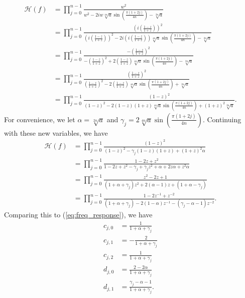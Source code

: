 \documentclass[a4paper]{article}
\begin{document}
\begin{align}
    \mathcal{H}(f) &= \prod_{j=0}^{n - 1}\frac{w^2}
        {w^2 - 2 i w \sqrt[4n]{a} \sin\left(\frac{\pi (1 + 2 j)}{4 n}\right) - \sqrt[2n]{a}} \\
    &= \prod_{j=0}^{n - 1}\frac{\left(i\left(\frac{1 - z}{1 + z}\right)\right)^2}
        {\left(i\left(\frac{1 - z}{1 + z}\right)\right)^2 - 2 i \left(i\left(\frac{1 - z}{1 + z}\right)\right) \sqrt[4n]{a} \sin\left(\frac{\pi (1 + 2 j)}{4 n}\right) - \sqrt[2n]{a}} \\
    &= \prod_{j=0}^{n - 1}\frac{-\left(\frac{1 - z}{1 + z}\right)^2}
        {-\left(\frac{1 - z}{1 + z}\right)^2 + 2 \left(\frac{1 - z}{1 + z}\right) \sqrt[4n]{a} \sin\left(\frac{\pi (1 + 2 j)}{4 n}\right) - \sqrt[2n]{a}} \\
    &= \prod_{j=0}^{n - 1}\frac{\left(\frac{1 - z}{1 + z}\right)^2}
        {\left(\frac{1 - z}{1 + z}\right)^2 - 2 \left(\frac{1 - z}{1 + z}\right) \sqrt[4n]{a} \sin\left(\frac{\pi (1 + 2 j)}{4 n}\right) + \sqrt[2n]{a}} \\
    &= \prod_{j=0}^{n - 1}\frac{(1 - z)^2}
        {(1 - z)^2 - 2 (1 - z)(1 + z) \sqrt[4n]{a} \sin\left(\frac{\pi (1 + 2 j)}{4 n}\right) + (1 + z)^2 \sqrt[2n]{a}}.
\end{align}
For convenience, we let $\alpha = \sqrt[2n]{a}$ and $\gamma_j = 2 \sqrt[4n]{a} \sin\left(\frac{\pi (1 + 2 j)}{4 n}\right)$.
Continuing with these new variables, we have
\begin{align}
    \mathcal{H}(f) &= \prod_{j=0}^{n - 1}\frac{(1 - z)^2}
        {(1 - z)^2 - \gamma_j (1 - z)(1 + z) + (1 + z)^2 \alpha} \\
    &= \prod_{j=0}^{n - 1}\frac{1 - 2z + z^2}
        {1 - 2z + z^2 - \gamma_j + \gamma_j z^2 + \alpha + 2z \alpha + z^2 \alpha} \\
    &= \prod_{j=0}^{n - 1}\frac{z^2 - 2z + 1}
        {(1 + \alpha + \gamma_j)z^2 + 2(\alpha - 1) z + (1 + \alpha - \gamma_j)} \\
        &= \prod_{j=0}^{n - 1}\frac{1 - 2z^{-1} + z^{-2}}
        {(1 + \alpha + \gamma_j) - 2(1 - \alpha) z^{-1} - (\gamma_j - \alpha - 1)z^{-2}}.
\end{align}
Comparing this to (\ref{eq:freq_response}), we have
\begin{align}
    c_{j,0} &= \frac{1}{1 + \alpha + \gamma_j} \\
    c_{j,1} &= -\frac{2}{1 + \alpha + \gamma_j} \\
    c_{j,2} &= \frac{1}{1 + \alpha + \gamma_j} \\
    d_{j,0} &= \frac{2-2\alpha}{1 + \alpha + \gamma_j} \\
    d_{j,1} &= \frac{\gamma_j - \alpha - 1}{1 + \alpha + \gamma_j}.
\end{align}
\end{document}
